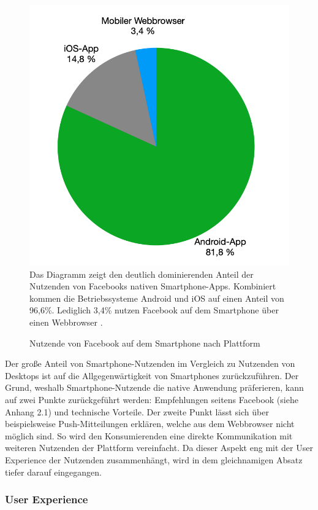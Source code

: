 \documentclass[a4paper]{scrartcl}
\begin{document}
\begin{figure}[H]
	\centering
	\caption{Nutzende von Facebook auf dem Smartphone nach Plattform}
	\includegraphics[scale=0.3]{_assets/facebook_mobile_users.png} \\
	Das Diagramm zeigt den deutlich dominierenden Anteil der Nutzenden von Facebooks nativen Smartphone-Apps. Kombiniert kommen die Betriebssysteme Android und iOS auf einen Anteil von 96,6\%. Lediglich 3,4\% nutzen Facebook auf dem Smartphone über einen Webbrowser \autocite{Kemp_Facebook}.
\end{figure}

Der große Anteil von Smartphone-Nutzenden im Vergleich zu Nutzenden von Desktops ist auf die Allgegenwärtigkeit von Smartphones zurückzuführen. Der Grund, weshalb Smartphone-Nutzende die native Anwendung präferieren, kann auf zwei Punkte zurückgeführt werden: Empfehlungen seitens Facebook (siehe Anhang 2.1) und technische Vorteile. Der zweite Punkt lässt sich über beispielsweise Push-Mitteilungen erklären, welche aus dem Webbrowser nicht möglich sind. So wird den Konsumierenden eine direkte Kommunikation mit weiteren Nutzenden der Plattform vereinfacht. Da dieser Aspekt eng mit der User Experience der Nutzenden zusammenhängt, wird in dem gleichnamigen Absatz tiefer darauf eingegangen.

\subsubsection{User Experience}
\end{document}
